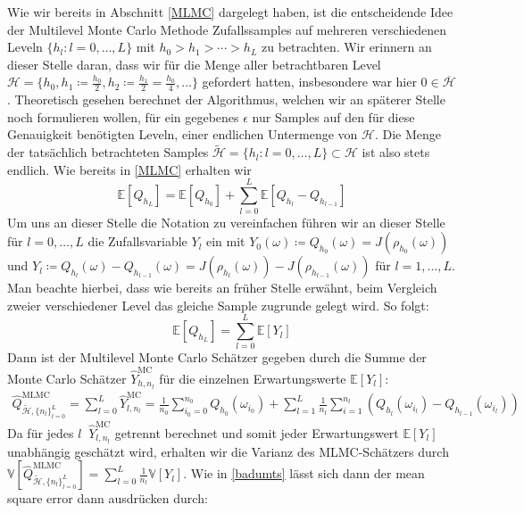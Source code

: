 Wie wir bereits in Abschnitt \ref{MLMC} dargelegt haben, ist die entscheidende Idee der Multilevel Monte Carlo Methode Zufallssamples auf mehreren verschiedenen Leveln $ \{ h_l : l = 0,\dots,L \} $ mit $ h_0 > h_1 > \cdots > h_L $ zu betrachten. Wir erinnern an dieser Stelle daran, dass wir für die Menge aller betrachtbaren Level $ \mathcal{H} = \{ h_0 , h_1 \coloneqq \frac{h_0}{2},h_2 \coloneqq \frac{h_1}{2} = \frac{h_0}{4}, \dots \} $ gefordert hatten, insbesondere war hier $0 \in \overline{\mathcal{H}}$. Theoretisch gesehen berechnet der Algorithmus, welchen wir an späterer Stelle noch formulieren wollen, für ein gegebenes $ \epsilon $ nur Samples auf den für diese Genauigkeit benötigten Leveln, einer endlichen Untermenge von $ \mathcal{H} $. Die Menge der tatsächlich betrachteten Samples $ \tilde{\mathcal{H}} = \{ h_l : l = 0,\dots,L \} \subset \mathcal{H} $ ist also stets endlich.
Wie bereits in \ref{MLMC} erhalten wir 
\[
\mathbb{E}[Q_{h_L}] = \mathbb{E}[Q_{h_0}] + \sum_ {l=0}^L \mathbb{E}[Q_{h_l}-Q_{h_{l-1}}]  
\]
Um uns an dieser Stelle die Notation zu vereinfachen führen wir an dieser Stelle für $ l=0,\dots,L $ die Zufallsvariable $ Y_l $ ein mit $ Y_0(\omega) \coloneqq Q_{h_0}(\omega) = J(\rho_{h_0}(\omega)) $ und $ Y_l \coloneqq Q_{h_l}(\omega) - Q_{h_{l-1}}(\omega) =  J(\rho_{h_l}(\omega)) - J(\rho_{h_{l-1}}(\omega))  $ für $ l=1,\dots,L $. Man beachte hierbei, dass wie bereits an früher Stelle erwähnt, beim Vergleich zweier verschiedener Level das gleiche Sample zugrunde gelegt wird. 
So folgt:
\[
	\mathbb{E}[Q_{h_L}] = \sum_{l=0}^L \mathbb{E}[Y_l]
\]
Dann ist der Multilevel Monte Carlo Schätzer gegeben durch die Summe der Monte Carlo Schätzer $ \widehat{Y}_{h,n_l}^{\text{MC}} $ für die einzelnen Erwartungswerte $ \mathbb{E}[Y_l] $:
\begin{align}
	\widehat{Q}_{\tilde{\mathcal{H}},\{ n_l \}_{l=0}^L }^{\text{MLMC}} = \sum_{l=0}^{L} \widehat{Y}_{l,n_l}^{\text{MC}} =  \frac{1}{n_0} \sum_{i_0=0}^{n_0} Q_{h_0}(\omega_{i_0}) + \sum_{l=1}^{L} \frac{1}{n_l} \sum_{i=1}^{n_l} \left( Q_{h_l}(\omega_{i_l}) - Q_{h_{l-1}}(\omega_{i_l})\right)
\end{align}
Da für jedes $ l \ $ $ \widehat{Y}_{l,n_l}^{\text{MC}} $ getrennt berechnet und somit jeder Erwartungswert $ \mathbb{E}[Y_l] $ unabhängig geschätzt wird, erhalten wir die Varianz des MLMC-Schätzers durch $\mathbb{V}[ \widehat{Q}_{\tilde{\mathcal{H}},\{ n_l \}_{l=0}^L }^{\text{MLMC}} ] = \sum_{l=0}^{L} \frac{1}{n_l} \mathbb{V}[Y_l]$. Wie in \ref{badumts} lässt sich dann der mean square error dann ausdrücken durch:
